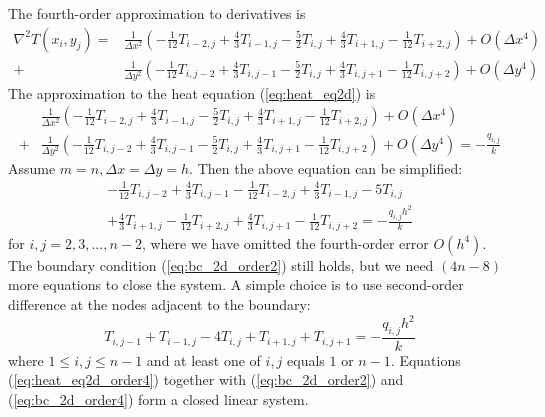 \documentclass{article}
\begin{document}
The fourth-order approximation to derivatives is
\begin{equation*}
\begin{split}
    \nabla^2 T(x_i, y_j) = & \frac{1}{\Delta x^2} \left( -\frac{1}{12}T_{i-2,j} + \frac{4}{3}T_{i-1,j}
    - \frac{5}{2}T_{i,j} + \frac{4}{3}T_{i+1,j} - \frac{1}{12}T_{i+2,j} \right) + O(\Delta x^4) \\
    + & \frac{1}{\Delta y^2} \left( -\frac{1}{12}T_{i,j-2} + \frac{4}{3}T_{i,j-1} - \frac{5}{2}T_{i,j}
    + \frac{4}{3}T_{i,j+1} - \frac{1}{12}T_{i,j+2} \right) + O(\Delta y^4)
\end{split}
\end{equation*}
The approximation to the heat equation (\ref{eq:heat_eq2d}) is
\begin{equation*}
\begin{split}
    & \frac{1}{\Delta x^2} \left( -\frac{1}{12}T_{i-2,j} + \frac{4}{3}T_{i-1,j}
    - \frac{5}{2}T_{i,j} + \frac{4}{3}T_{i+1,j} - \frac{1}{12}T_{i+2,j} \right) + O(\Delta x^4) \\
    + & \frac{1}{\Delta y^2} \left( -\frac{1}{12}T_{i,j-2} + \frac{4}{3}T_{i,j-1} - \frac{5}{2}T_{i,j}
    + \frac{4}{3}T_{i,j+1} - \frac{1}{12}T_{i,j+2} \right) + O(\Delta y^4)
    = - \frac{q_{i,j}}{k}
\end{split}
\end{equation*}
Assume $m = n, \Delta x = \Delta y = h$. Then the above equation can be simplified:
\begin{multline} \label{eq:heat_eq2d_order4}
    -\frac{1}{12}T_{i,j-2} + \frac{4}{3}T_{i,j-1} - \frac{1}{12}T_{i-2,j} + \frac{4}{3}T_{i-1,j}
    - 5T_{i,j} \\
    + \frac{4}{3}T_{i+1,j} - \frac{1}{12}T_{i+2,j} + \frac{4}{3}T_{i,j+1} - \frac{1}{12}T_{i,j+2}
    = - \frac{q_{i,j} h^2}{k}
\end{multline}
for $i,j = 2, 3, ..., n-2$, where we have omitted the fourth-order error $O(h^4)$. The boundary condition
(\ref{eq:bc_2d_order2}) still holds, but we need $(4n - 8)$ more equations to close the system. A simple
choice is to use second-order difference at the nodes adjacent to the boundary:
\begin{equation} \label{eq:bc_2d_order4}
    T_{i,j-1} + T_{i-1,j} - 4T_{i,j} + T_{i+1,j} + T_{i,j+1} = - \frac{q_{i,j} h^2}{k}
\end{equation}
where $1 \le i,j \le n-1$ and at least one of $i,j$ equals $1$ or $n-1$. Equations (\ref{eq:heat_eq2d_order4})
together with (\ref{eq:bc_2d_order2}) and (\ref{eq:bc_2d_order4}) form a closed linear system.
\end{document}
